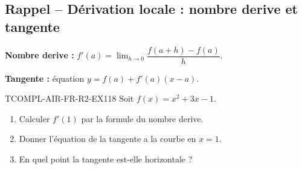 

\subsection*{Rappel -- Dérivation locale : nombre derive et tangente}

\textbf{Nombre derive :} $f'(a) = \lim_{h \to 0} \dfrac{f(a+h) - f(a)}{h}$.

\textbf{Tangente :} équation $y = f(a) + f'(a)(x - a)$.

\begin{exercice}{TCOMPL-AIR-FR-R2-EX1}{1}{8}
Soit $f(x) = x^2 + 3x - 1$.
\begin{enumerate}
  \item Calculer $f'(1)$ par la formule du nombre derive.
  \item Donner l'équation de la tangente a la courbe en $x = 1$.
  \item En quel point la tangente est-elle horizontale ?
\end{enumerate}
\end{exercice}

